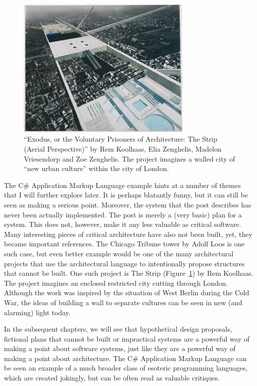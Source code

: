 \begin{figure}
\centering
\includegraphics[width=0.75\textwidth]{fig/strip.jpg}\quad
\caption{``Exodus, or the Voluntary Prisoners of Architecture: The Strip (Aerial Perspective)''
by Rem Koolhaas, Elia Zenghelis, Madelon Vriesendorp and Zoe Zenghelis. The project
imagines a walled city of ``new urban culture'' within the city of London.}
\label{fig:exodus}
\end{figure}

The C\# Application Markup Language example hints at a number of themes that I will further
explore later. It is perhaps blatantly funny, but it can still be seen as making a serious point.
Moreover, the system that the post describes has never been actually implemented. The post
is merely a (very basic) plan for a system. This does not, however, make it any less valuable
as critical software. Many interesting pieces of critical architecture have also not been
built, yet, they became important references. The Chicago Tribune tower by Adolf Loos is one
such case, but even better example would be one of the many architectural projects that
use the architectural language to intentionally propose structures that cannot be built.
One such project is The Strip (Figure~\ref{fig:exodus}) by Rem Koolhaas. The project imagines
an enclosed restricted city cutting through London. Although the work was inspired by the
situation of West Berlin during the Cold War, the ideas of building a wall to separate cultures
can be seen in new (and alarming) light today.

In the subsequent chapters, we will see that hypothetical design proposals, fictional
plans that cannot be built or impractical systems are a powerful way of making a point
about software systems, just like they are a powerful way of making a point about architecture.
The C\# Application Markup Language can be seen an example of a much broader class of
esoteric programming languages, which are created jokingly, but can be often read as
valuable critiques.

